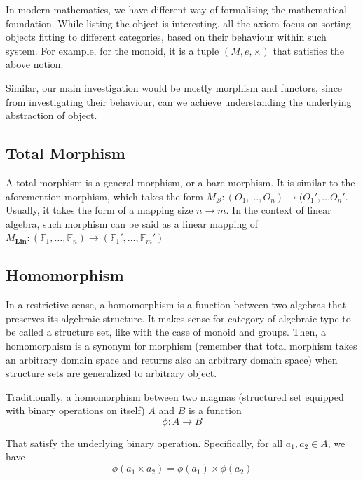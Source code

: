 In modern mathematics, we have different way of formalising the mathematical foundation. While listing the object is interesting, all the axiom focus on sorting objects fitting to different categories, based on their behaviour within such system. For example, for the monoid, it is a tuple $(M,e,\times)$ that satisfies the above notion. 

Similar, our main investigation would be mostly morphism and functors, since from investigating their behaviour, can we achieve understanding the underlying abstraction of object. 

\subsection{Total Morphism}

A total morphism is a general morphism, or a bare morphism. It is similar to the aforemention morphism, which takes the form $M_{\mathcal{B}}:(O_{1},\dots,O_{n})\longrightarrow (O_{1}',\dots O_{n}'$. Usually, it takes the form of a mapping size $n\to m$. In the context of linear algebra, such morphism can be said as a linear mapping of $M_{\mathbf{Lin}}: (\mathbb{F}_1, \dots, \mathbb{F}_n)\longrightarrow (\mathbb{F}_{1}',\dots,\mathbb{F}_{m}')$

\subsection{Homomorphism}

In a restrictive sense, a homomorphism is a function between two algebras that preserves its algebraic structure. It makes sense for category of algebraic type to be called a structure set, like with the case of monoid and groups. Then, a homomorphism is a synonym for morphism (remember that total morphism takes an arbitrary domain space and returns also an arbitrary domain space) when structure sets are generalized to arbitrary object. 

Traditionally, a homomorphism between two magmas (structured set equipped with binary operations on itself) $A$ and $B$ is a function 
\begin{equation*}
    \phi : A \longrightarrow B
\end{equation*}

That satisfy the underlying binary operation. Specifically, for all $a_{1}, a_{2}\in A$, we have 
\begin{equation*}
    \phi (a_1 \times a_2) = \phi (a_1) \times \phi(a_2)
\end{equation*}

